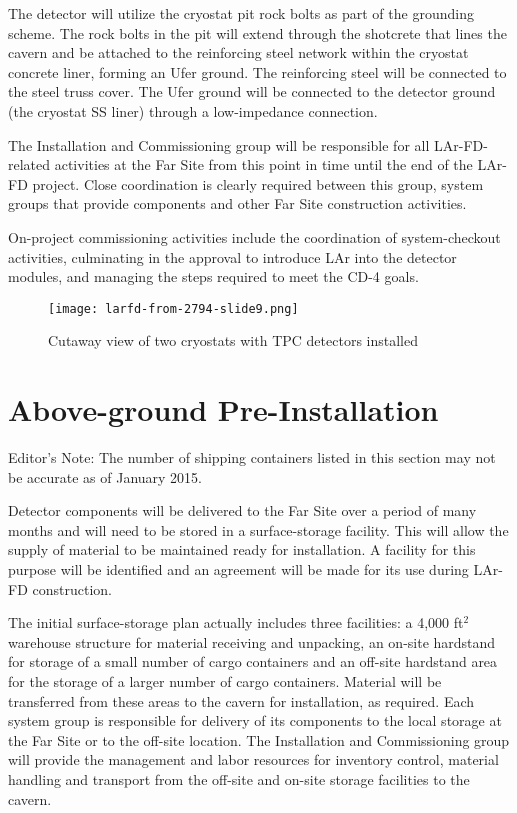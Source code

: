 The detector will utilize the cryostat pit rock bolts as part of the grounding scheme. The rock bolts in the pit will extend through the shotcrete that lines the cavern and be attached to the reinforcing steel network within the cryostat concrete liner, forming an Ufer ground. The reinforcing steel will be connected to the steel truss cover. The Ufer ground will be connected to the detector ground (the cryostat SS liner) through a low-impedance connection.

The Installation and Commissioning group will be responsible for all LAr-FD-related activities at the Far Site from this point in time until the end of the LAr-FD project. Close coordination is clearly required between this group, system groups that provide components and other Far Site construction activities. 

On-project commissioning activities include the coordination of system-checkout activities, culminating in the approval to introduce LAr into the detector modules, and managing the steps required to meet the CD-4 goals. 

\begin{figure}[htpb]
\centering
\texttt{[image: larfd-from-2794-slide9.png]}
\caption{Cutaway view of two cryostats with TPC detectors installed}
\label{fig:tpc-in-two-cryostats}
\end{figure}

\section{Above-ground Pre-Installation}

\notestart
Editor's Note:  The number of shipping containers listed in this section may not be accurate as of January 2015.
\notestop

Detector components will be delivered to the Far Site over a period of many months and will need to be stored in a surface-storage facility. This will allow the supply of material to be maintained ready for installation.  A facility for this purpose 
will be identified and an agreement will be made for its use during LAr-FD construction. 

The initial surface-storage plan actually includes three facilities:  a 4,000 ft$^2$ warehouse structure for material receiving and unpacking, an on-site hardstand for storage of a small number of cargo containers and an off-site hardstand area for the storage of 
a larger number of cargo containers. Material will be transferred from these areas to the cavern for installation, as required. Each system group is  
responsible for delivery of  
its components to the local storage at the Far Site or to the off-site location.  
The Installation and Commissioning group will provide the management and labor resources for inventory control, material handling and transport from the off-site and on-site storage facilities to the cavern.

